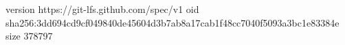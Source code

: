 version https://git-lfs.github.com/spec/v1
oid sha256:3dd694cd9cf049840de45604d3b7ab8a17cab1f48cc7040f5093a3bc1e83384e
size 378797
